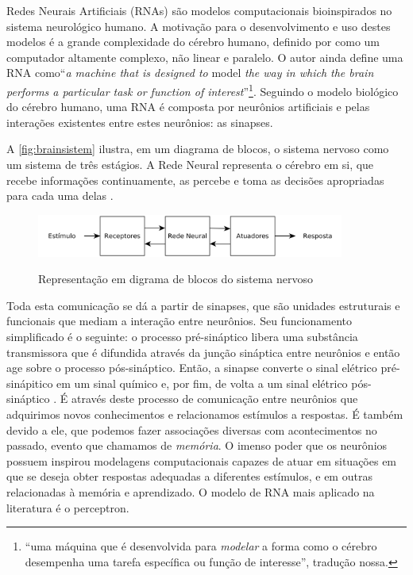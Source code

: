 Redes Neurais Artificiais (RNAs) são modelos computacionais bioinspirados no sistema neurológico humano. A motivação para o desenvolvimento e uso destes modelos é a grande complexidade do cérebro humano, definido por  como um computador altamente complexo, não linear e paralelo. O autor ainda define uma RNA como``\textit{a machine that is designed to} model \textit{the way in which the brain performs a particular task or function of interest}''\footnote{``uma máquina que é desenvolvida para \textit{modelar} a forma como o cérebro desempenha uma tarefa específica ou função de interesse'', tradução nossa.}. Seguindo o modelo biológico do cérebro humano, uma RNA é composta por neurônios artificiais e pelas interações existentes entre estes neurônios: as sinapses.

A \autoref{fig:brainsistem} ilustra, em um diagrama de blocos, o sistema nervoso como um sistema de três estágios. A Rede Neural representa o cérebro em si, que recebe informações continuamente, as percebe e toma as decisões apropriadas para cada uma delas \cite[p.~24]{Haykin1998}.

\begin{figure}[!htb]
    \centering
    \caption{Representação em digrama de blocos do sistema nervoso}
    \includegraphics[width=0.9\textwidth]{./04-figuras/brain_sistem_block_diagram}
    \label{fig:brainsistem}
\end{figure}

Toda esta comunicação se dá a partir de sinapses, que são unidades estruturais e funcionais que mediam a interação entre neurônios. Seu funcionamento simplificado é o seguinte: o processo pré-sináptico libera uma substância transmissora que é difundida através da junção sináptica entre neurônios e então age sobre o processo pós-sináptico. Então, a sinapse converte o sinal elétrico pré-sinápitico em um sinal químico e, por fim, de volta a um sinal elétrico pós-sináptico \cite[p.~28]{Haykin1998}. É através deste processo de comunicação entre neurônios que adquirimos novos conhecimentos e relacionamos estímulos a respostas. É também devido a ele, que podemos fazer associações diversas com acontecimentos no passado, evento que chamamos de \textit{memória}. O imenso poder que os neurônios possuem inspirou modelagens computacionais capazes de atuar em situações em que se deseja obter respostas adequadas a diferentes estímulos, e em outras relacionadas à memória e aprendizado. O modelo de RNA mais aplicado na literatura é o perceptron. 

